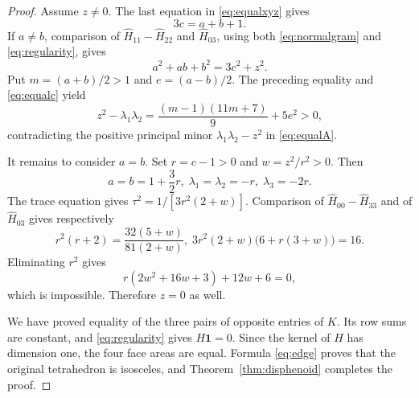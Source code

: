 \documentclass[11pt]{article}
\theoremstyle{definition}
\theoremstyle{remark}
\newcommand{\one}{\mathbf 1}
\begin{document}
\begin{proof}
Assume $z\ne0$. The last equation in \eqref{eq:equalxyz} gives
\begin{equation}
3c=a+b+1.
\label{eq:equalc}
\end{equation}
If $a\ne b$, comparison of $\widehat H_{11}-\widehat H_{22}$ and $\widehat H_{03}$, using both \eqref{eq:normalgram} and \eqref{eq:regularity}, gives
\[
a^2+ab+b^2=3c^2+z^2.
\]
Put $m=(a+b)/2>1$ and $e=(a-b)/2$. The preceding equality and \eqref{eq:equalc} yield
\[
z^2-\lambda_1\lambda_2
=\frac{(m-1)(11m+7)}9+5e^2>0,
\]
contradicting the positive principal minor $\lambda_1\lambda_2-z^2$ in \eqref{eq:equalA}.

It remains to consider $a=b$. Set $r=c-1>0$ and $w=z^2/r^2>0$. Then
\[
a=b=1+\frac32r,\;
\lambda_1=\lambda_2=-r,\; \lambda_3=-2r.
\]
The trace equation gives $\tau^2=1/[3r^2(2+w)]$. Comparison of $\widehat H_{00}-\widehat H_{33}$ and of $\widehat H_{03}$ gives respectively
\[
r^2(r+2)=\frac{32(5+w)}{81(2+w)},
\;
3r^2(2+w)\bigl(6+r(3+w)\bigr)=16.
\]
Eliminating $r^2$ gives
\[
r(2w^2+16w+3)+12w+6=0,
\]
which is impossible. Therefore $z=0$ as well.

We have proved equality of the three pairs of opposite entries of $K$. Its row sums are constant, and \eqref{eq:regularity} gives $H\one=0$. Since the kernel of $H$ has dimension one, the four face areas are equal. Formula \eqref{eq:edge} proves that the original tetrahedron is isosceles, and Theorem~\ref{thm:disphenoid} completes the proof.
\end{proof}
\end{document}
